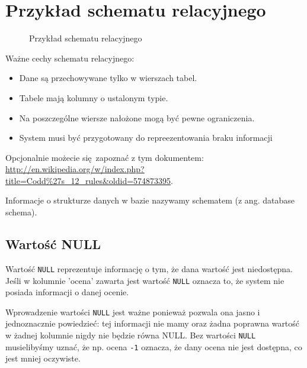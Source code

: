 \documentclass[a4paper]{article}
\begin{document}
\section{Przykład schematu relacyjnego%
  \label{przyklad-schematu-relacyjnego}%
}

\begin{figure}
\noindent{}
\caption{Przykład schematu relacyjnego}
\end{figure}

Ważne cechy schematu relacyjnego:
%
\begin{itemize}

\item Dane są przechowywane tylko w wierszach tabel.

\item Tabele mają kolumny o ustalonym typie.

\item Na poszczególne wiersze nałożone mogą być pewne ograniczenia.

\item System musi być przygotowany do repreezentowania \textquotedbl{}braku informacji\textquotedbl{}

\end{itemize}

Opcjonalnie możecie się~zapoznać z tym dokumentem: \url{http://en.wikipedia.org/w/index.php?title=Codd\%27s_12_rules&oldid=574873395}.

Informacje o strukturze danych w bazie nazywamy
schematem (z ang. database schema).


\subsection{Wartość NULL%
  \label{wartosc-null}%
}

Wartość \texttt{NULL} reprezentuje informację o tym, że dana wartość jest niedostępna.
Jeśli w kolumnie 'ocena' zawarta jest wartość \texttt{NULL} oznacza to, że system nie posiada
informacji o danej ocenie.

Wprowadzenie wartości \texttt{NULL} jest ważne ponieważ pozwala ona jasno i jednoznacznie
powiedzieć: tej informacji nie mamy oraz żadna poprawna wartość w żadnej kolumnie
nigdy nie będzie równa NULL. Bez wartości \texttt{NULL} musielibyśmy uznać, że np. ocena
\texttt{-1} oznacza, że dany ocena nie jest dostępna, co jest mniej oczywiste.
\end{document}
